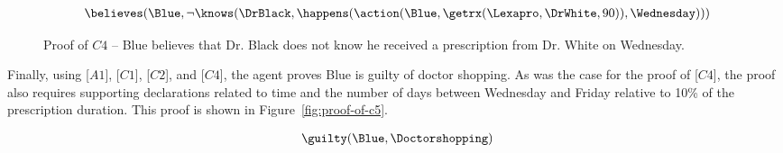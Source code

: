 \begin{footnotesize}
\begin{align*}
[C4] \ \believes(\Blue, \neg \knows(\DrBlack,\happens(\action(\Blue,\getrx(\Lexapro,\DrWhite,90)),\Wednesday)))
\end{align*}
\end{footnotesize}

\begin{figure}[h!] 
\vspace{6pt}
\label{fig:proof-of-c4}
\centering
{}
\caption{Proof of $C4$ -- Blue believes that Dr. Black does not know he received a prescription from Dr. White on Wednesday.}
\end{figure}


\noindent Finally, using [$A1$], [$C1$], [$C2$], and [$C4$], the agent proves Blue is guilty of doctor shopping.  As was the case for the proof of [$C4$], the proof also requires supporting declarations related to time and the number of days between Wednesday and Friday relative to 10\% of the prescription duration.  This proof is shown in Figure~\ref{fig:proof-of-c5}.
\begin{footnotesize}
\begin{align*}
[C5] \ \guilty(\Blue,\Doctorshopping)
\end{align*}
\end{footnotesize}


